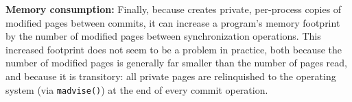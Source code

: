 

\textbf{Memory consumption: }
Finally, because \dthreads{} creates private, per-process copies of
modified pages between commits, it can increase a program's memory
footprint by the number of modified pages between synchronization
operations. This increased footprint does not seem to be a problem in
practice, both because the number of modified pages is generally far
smaller than the number of pages read, and because it is transitory:
all private pages are relinquished to the operating system
(via \texttt{madvise()}) at the end of every commit operation.



